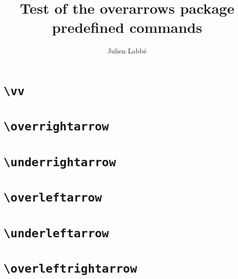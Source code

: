 \documentclass[12pt]{article}
\title{Test of the \textsf{overarrows} package\\ predefined commands}
\author{Julien Labb\'e}
\begin{document}
\maketitle

\section{\texttt{\textbackslash vv}}

\begin{dispExample}
\end{dispExample}

\section{\texttt{\textbackslash overrightarrow}}

\begin{dispExample}
\end{dispExample}

\section{\texttt{\textbackslash underrightarrow}}

\begin{dispExample}
\end{dispExample}

\section{\texttt{\textbackslash overleftarrow}}

\begin{dispExample}
\end{dispExample}

\section{\texttt{\textbackslash underleftarrow}}

\begin{dispExample}
\end{dispExample}

\section{\texttt{\textbackslash overleftrightarrow}}
\end{document}
